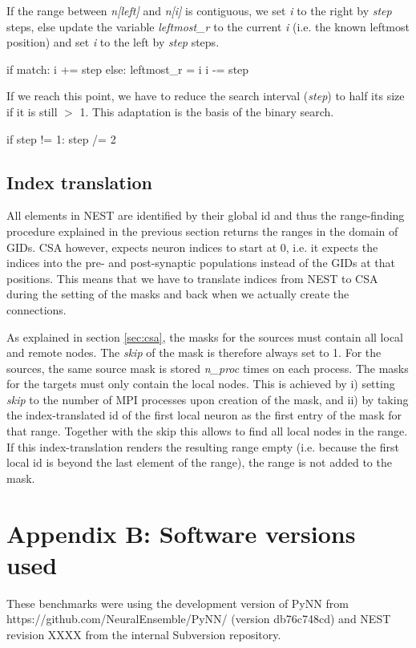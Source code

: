 \documentclass{frontiersSCNS} %
\begin{document}
If the range between \emph{n[left]} and \emph{n[i]} is contiguous, we
set \emph{i} to the right by \emph{step} steps, else update the
variable \emph{leftmost\_r} to the current \emph{i} (i.e. the known
leftmost position) and set \emph{i} to the left by \emph{step} steps.

\begin{pythoncode}
        if match:
            i += step
        else:
            leftmost_r = i
            i -= step
\end{pythoncode}

If we reach this point, we have to reduce the search interval
(\emph{step}) to half its size if it is still $>$ 1. This adaptation
is the basis of the binary search.

\begin{pythoncode}
        if step != 1:
            step /= 2
\end{pythoncode}

\subsection*{Index translation}

All elements in NEST are identified by their global id and thus the
range-finding procedure explained in the previous section returns the
ranges in the domain of GIDs. CSA however, expects neuron indices to
start at 0, i.e. it expects the indices into the pre- and
post-synaptic populations instead of the GIDs at that positions. This
means that we have to translate indices from NEST to CSA during the
setting of the masks and back when we actually create the connections.

As explained in section \ref{sec:csa}, the masks for the sources must
contain all local and remote nodes. The \emph{skip} of the mask is
therefore always set to 1. For the sources, the same source mask is
stored \emph{n\_proc} times on each process. The masks for the targets
must only contain the local nodes. This is achieved by i) setting
\emph{skip} to the number of MPI processes upon creation of the mask,
and ii) by taking the index-translated id of the first local neuron as
the first entry of the mask for that range. Together with the skip
this allows to find all local nodes in the range. If this
index-translation renders the resulting range empty (i.e. because the
first local id is beyond the last element of the range), the range is
not added to the mask.

\section*{Appendix B: Software versions used}

These benchmarks were using the development version of PyNN from 
https://github.com/NeuralEnsemble/PyNN/ (version db76c748cd) and NEST
revision XXXX from the internal Subversion repository.




\end{document}
